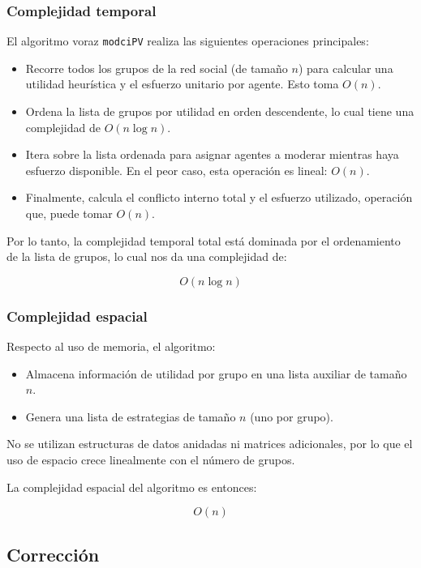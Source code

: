 \documentclass[11pt,letter]{article}
\begin{document}
\subsubsection{Complejidad temporal}

El algoritmo voraz \texttt{modciPV} realiza las siguientes operaciones principales:

\begin{itemize}
    \item Recorre todos los grupos de la red social (de tamaño $n$) para calcular una utilidad heurística y el esfuerzo unitario por agente. Esto toma ${O}(n)$.
    \item Ordena la lista de grupos por utilidad en orden descendente, lo cual tiene una complejidad de ${O}(n \log n)$.
    \item Itera sobre la lista ordenada para asignar agentes a moderar mientras haya esfuerzo disponible. En el peor caso, esta operación es lineal: ${O}(n)$.
    \item Finalmente, calcula el conflicto interno total y el esfuerzo utilizado, operación que, puede tomar ${O}(n)$.
\end{itemize}

Por lo tanto, la complejidad temporal total está dominada por el ordenamiento de la lista de grupos, lo cual nos da una complejidad de:

\[
{O}(n \log n)
\]

\subsubsection{Complejidad espacial}

Respecto al uso de memoria, el algoritmo:

\begin{itemize}
    \item Almacena información de utilidad por grupo en una lista auxiliar de tamaño $n$.
    \item Genera una lista de estrategias de tamaño $n$ (uno por grupo).
\end{itemize}

No se utilizan estructuras de datos anidadas ni matrices adicionales, por lo que el uso de espacio crece linealmente con el número de grupos.

La complejidad espacial del algoritmo es entonces:

\[
{O}(n)
\]

\subsection{Corrección}
\end{document}
